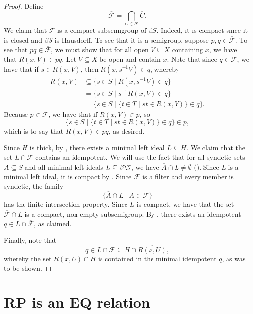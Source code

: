 \begin{proof}
    Define
    \[\overline{\mathscr{F}} = \bigcap_{C \in \mathscr{F}} \overline{C}.\]
    We claim that $\overline{\mathscr{F}}$ is a compact subsemigroup of $\beta S$. Indeed, it is compact since it is closed and $\beta S$ is Hausdorff.  To see that it is a semigroup, suppose $p, q \in \overline{\mathscr{F}}$. To see that $pq \in \overline{\mathscr{F}}$, we must show that for all open $V \subseteq X$ containing $x$, we have that $R(x, V) \in pq$.  Let $V \subseteq X$ be open and contain $x$.
    Note that since $q \in \overline{\mathscr{F}}$, we have that if $s \in R(x,V)$, then $R(x,s^{-1}V) \in q$, whereby
    \begin{align*}
        R(x,V) &\subseteq \big\{ s \in S \mid R(x,s^{-1}V) \in q \} \\
        &= \big\{ s \in S \mid s^{-1}R(x,V) \in q \}\\
        &= \big\{ s \in S \mid \{ t \in T \mid st \in R(x,V) \} \in q \}.
    \end{align*}
    Because $p \in \overline{\mathscr{F}}$, we have that if $R(x,V) \in p$, so
    \[\big\{ s \in S \mid \{ t \in T \mid st \in R(x,V) \} \in q \} \in p,\]
    which is to say that $R(x, V) \in pq$, as desired.

    Since $H$ is thick, by \cite[Thm. 4.48]{hindman_strauss_book_2012}, there exists a minimal left ideal $L \subseteq \overline{H}$.
    We claim that the set $L \cap \overline{\mathscr{F}}$ contains an idempotent.
    We will use the fact that for all syndetic sets $A \subseteq S$ and all minimal left ideals $L \subseteq \beta \N$, we have $\overline{A} \cap L \neq \emptyset$ (\cite[Thm. 4.48]{hindman_strauss_book_2012}).  Since $L$ is a minimal left ideal, it is compact by \cite[Thm. 2.6]{hindman_strauss_book_2012}.  Since $\mathscr{F}$ is a filter and every member is syndetic, the family
    \[\big\{\overline{A} \cap L  \mid  A \in \mathscr{F} \big\}\]
    has the finite intersection property.  Since $L$ is compact, we have that the set $\overline{\mathscr{F}} \cap L$ is a compact, non-empty subsemigroup. By \cite[Thm. 2.5]{hindman_strauss_book_2012}, there exists an idempotent $q \in L \cap \overline{\mathscr{F}}$, as claimed.

    Finally, note that
    \[q \in L \cap \overline{\mathscr{F}} \subseteq \overline{H} \cap \overline{R(x,U)},\]
    whereby the set $R(x,U) \cap H$ is contained in the minimal idempotent $q$, as was to be shown.
\end{proof}


\section{RP is an EQ relation}
\label{sec_RP}

